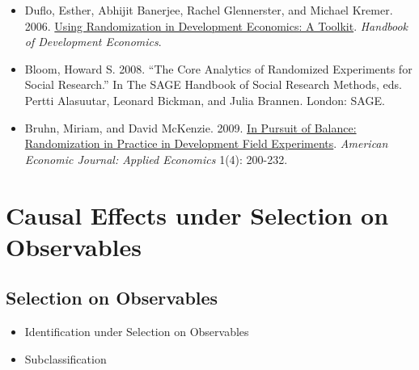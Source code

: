 \documentclass{article}
\begin{document}
\begin{itemize}

\item Duflo, Esther, Abhijit Banerjee, Rachel Glennerster, and Michael Kremer. 2006.  \href{http://economics.mit.edu/files/806}{Using Randomization in Development Economics: A Toolkit}. \textit{Handbook of Development Economics}.

\item Bloom, Howard S. 2008. ``The Core Analytics of Randomized Experiments for Social Research.'' In The SAGE Handbook of Social Research Methods, eds. Pertti Alasuutar, Leonard Bickman, and Julia Brannen. London: SAGE.

\item Bruhn, Miriam, and David McKenzie. 2009. \href{http://pubs.aeaweb.org/doi/pdfplus/10.1257/app.1.4.200}{In Pursuit of Balance: Randomization in Practice in Development Field Experiments}. \textit{American Economic Journal: Applied Economics} 1(4): 200-232.



\end{itemize}

\section{Causal Effects under Selection on Observables}

\subsection{Selection on Observables}
\begin{itemize}
\item Identification under Selection on Observables
\item Subclassification
\end{itemize}
\end{document}
